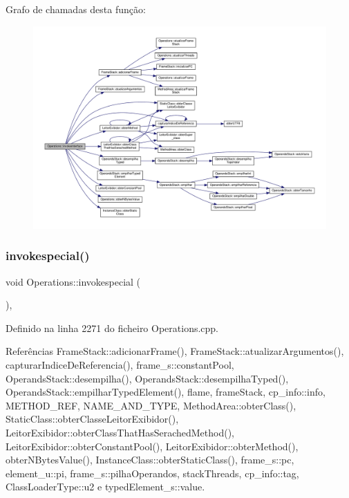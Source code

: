 Grafo de chamadas desta função\+:
\nopagebreak
\begin{figure}[H]
\begin{center}
\leavevmode
\includegraphics[width=350pt]{classOperations_a9206595fad5d3ac24514b2dfd6a013da_cgraph}
\end{center}
\end{figure}
\mbox{\label{classOperations_ab561e27c8450ceec7e4f8b0a155fcda3}} 
\subsubsection{\texorpdfstring{invokespecial()}{invokespecial()}}
{\footnotesize\ttfamily void Operations\+::invokespecial (\begin{DoxyParamCaption}{ }\end{DoxyParamCaption})\hspace{0.3cm}{\ttfamily [static]}, {\ttfamily [private]}}



Definido na linha 2271 do ficheiro Operations.\+cpp.



Referências Frame\+Stack\+::adicionar\+Frame(), Frame\+Stack\+::atualizar\+Argumentos(), capturar\+Indice\+De\+Referencia(), frame\+\_\+s\+::constant\+Pool, Operands\+Stack\+::desempilha(), Operands\+Stack\+::desempilha\+Typed(), Operands\+Stack\+::empilhar\+Typed\+Element(), flame, frame\+Stack, cp\+\_\+info\+::info, M\+E\+T\+H\+O\+D\+\_\+\+R\+EF, N\+A\+M\+E\+\_\+\+A\+N\+D\+\_\+\+T\+Y\+PE, Method\+Area\+::obter\+Class(), Static\+Class\+::obter\+Classe\+Leitor\+Exibidor(), Leitor\+Exibidor\+::obter\+Class\+That\+Has\+Serached\+Method(), Leitor\+Exibidor\+::obter\+Constant\+Pool(), Leitor\+Exibidor\+::obter\+Method(), obter\+N\+Bytes\+Value(), Instance\+Class\+::obter\+Static\+Class(), frame\+\_\+s\+::pc, element\+\_\+u\+::pi, frame\+\_\+s\+::pilha\+Operandos, stack\+Threads, cp\+\_\+info\+::tag, Class\+Loader\+Type\+::u2 e typed\+Element\+\_\+s\+::value.

